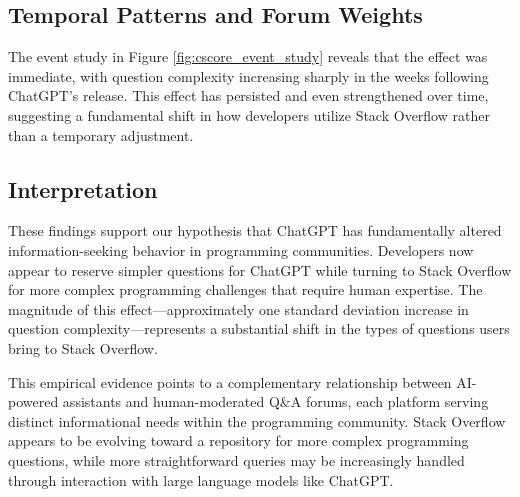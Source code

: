 \subsection{Temporal Patterns and Forum Weights}

The event study in Figure \ref{fig:cscore_event_study} reveals that the effect was immediate, with question complexity increasing sharply in the weeks following ChatGPT's release. This effect has persisted and even strengthened over time, suggesting a fundamental shift in how developers utilize Stack Overflow rather than a temporary adjustment.

\subsection{Interpretation}

These findings support our hypothesis that ChatGPT has fundamentally altered information-seeking behavior in programming communities. Developers now appear to reserve simpler questions for ChatGPT while turning to Stack Overflow for more complex programming challenges that require human expertise. The magnitude of this effect—approximately one standard deviation increase in question complexity—represents a substantial shift in the types of questions users bring to Stack Overflow.

This empirical evidence points to a complementary relationship between AI-powered assistants and human-moderated Q\&A forums, each platform serving distinct informational needs within the programming community. Stack Overflow appears to be evolving toward a repository for more complex programming questions, while more straightforward queries may be increasingly handled through interaction with large language models like ChatGPT.